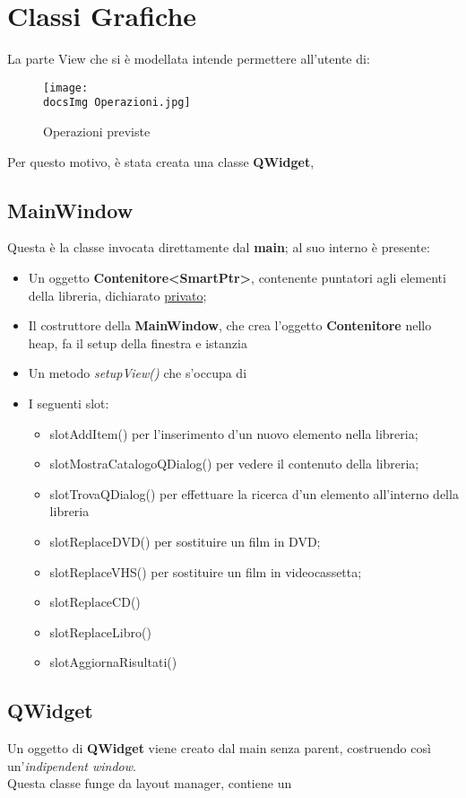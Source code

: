 \section{Classi Grafiche}{
	La parte View che si è modellata intende permettere all'utente di:

	\begin{figure}[h]
			\begin{center}
				\texttt{[image: \\docsImg Operazioni.jpg]}
				\caption{Operazioni previste}
			\end{center}
	\end{figure}
	
	Per questo motivo, è stata creata una classe \textbf{QWidget},
	\subsection{MainWindow}{
		Questa è la classe invocata direttamente dal \textbf{main}; al suo interno è presente:
		\begin{itemize}\itemsep=0.5pt
			\item Un oggetto \textbf{Contenitore<SmartPtr>}, contenente puntatori agli elementi della libreria, dichiarato \underline{privato};
			\item Il costruttore della \textbf{MainWindow}, che crea l'oggetto \textbf{Contenitore} nello heap, fa il setup della finestra e istanzia 
			\item Un metodo \textit{setupView()} che s'occupa di
			\item I seguenti slot:
			\begin{itemize}\itemsep=0.5pt
				\item slotAddItem() per l'inserimento d'un nuovo elemento nella libreria;
				\item slotMostraCatalogoQDialog()  per vedere il contenuto della libreria;
				\item slotTrovaQDialog() per effettuare la ricerca d'un elemento all'interno della libreria
			    \item slotReplaceDVD() per sostituire un film in DVD;
			    \item slotReplaceVHS() per sostituire un film in videocassetta;
			    \item slotReplaceCD()
			    \item slotReplaceLibro()
			    \item slotAggiornaRisultati() 
			\end{itemize}
		\end{itemize}
	}
	
	\subsection{QWidget}{
		Un oggetto di \textbf{QWidget} viene creato dal main senza parent, costruendo così un'\textit{indipendent window}. \\
		Questa classe funge da layout manager, contiene un 
	}
}